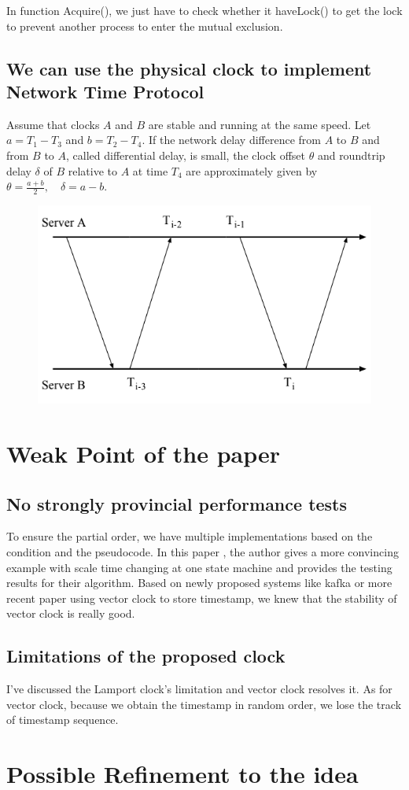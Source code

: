 \documentclass[acmlarge]{acmart}
\begin{document}
In function Acquire(), we just have to check whether it haveLock() to get the lock to prevent another process to enter the mutual exclusion.
\subsection{We can use the physical clock to implement Network Time Protocol}
Assume that clocks $A$ and $B$ are stable and running at the same speed. Let $a=T_{1}-T_{3}$ and $b=T_{2}-T_{4}$. If the network delay difference from $A$ to $B$ and from $B$ to $A$, called differential delay, is small, the clock offset $\theta$ and roundtrip delay $\delta$ of $B$ relative to $A$ at time $T_{4}$ are approximately given by $\theta=\frac{a+b}{2}, \quad \delta=a-b$.
\begin{figure}[h]
  \centering
  \includegraphics[width=0.3\linewidth]{ntp.png}
  \caption{}
\end{figure}

\section{Weak Point of the paper}
\subsection {No strongly provincial performance tests}
To ensure the partial order, we have multiple implementations based on the condition and the pseudocode. In this paper \cite{fidge1987timestamps},
the author gives a more convincing example with scale time changing at one state machine and provides the testing results for their algorithm.
Based on newly proposed systems like kafka \cite{Bench-kafka} or more recent paper \cite{kshemkalyani2020prime} using vector clock to store timestamp, we knew that the stability of vector clock is really good.
\subsection{Limitations of the proposed clock}
I've discussed the Lamport clock's limitation and vector clock resolves it. As for vector clock, because we obtain the timestamp in random order, we lose the track of timestamp sequence.
\section{Possible Refinement to the idea}
\end{document}
